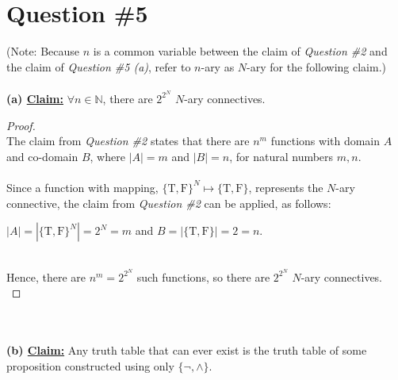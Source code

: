 \documentclass[12pt]{article}
\begin{document}
\section*{Question \#5}
(Note: Because $n$ is a common variable between the claim of \textit{Question \#2} and the claim of \textit{Question \#5 (a)}, refer to $n$-ary as $N$-ary for the following claim.) \\
\\
\textbf{(a) \underline{Claim:}} $\forall n \in \mathbb{N}$, there are $2^{2^N}$ $N$-ary connectives.
\begin{proof}
\leavevmode\\
    The claim from \textit{Question \#2} states that there are $n^m$ functions with domain $A$ and co-domain $B$, where $|A| = m$ and $|B| = n$, for natural numbers $m, n$. \\
    \\
    Since a function with mapping, $\{\text{T}, \text{F}\}^N \mapsto \{\text{T}, \text{F}\}$, represents the $N$-ary connective, the claim from \textit{Question \#2} can be applied, as follows:
    \begin{center}
        $|A| = |\{\text{T}, \text{F}\}^N| = 2^N = m$ and $B = |\{\text{T}, \text{F}\}| = 2 = n$. \\
    \end{center}
    \leavevmode\\
    Hence, there are $n^m = 2^{2^N}$ such functions, so there are $2^{2^N}$ $N$-ary connectives. \\
\end{proof}
\leavevmode\\\\
\textbf{(b) \underline{Claim:}} Any truth table that can ever exist is the truth table of some proposition constructed using only $\{\neg, \land\}$.
\end{document}
